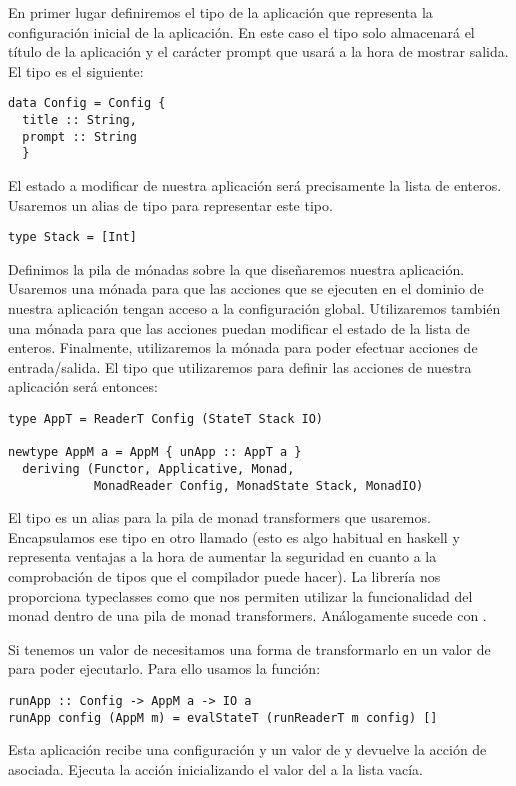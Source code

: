 En primer lugar definiremos el tipo  de la aplicación que
representa la configuración inicial de la aplicación. En este caso
el tipo  solo almacenará el título de la aplicación y
el carácter prompt que usará a la hora de mostrar salida. El tipo
es el siguiente:
\begin{verbatim}
data Config = Config {
  title :: String,
  prompt :: String
  }
\end{verbatim}
El estado a modificar de nuestra aplicación será precisamente la
lista de enteros. Usaremos un alias de tipo para representar este
tipo.
\begin{verbatim}
type Stack = [Int]
\end{verbatim}
Definimos la pila de mónadas sobre la que diseñaremos nuestra
aplicación. Usaremos una mónada
 para que las acciones
que se ejecuten en el dominio de nuestra aplicación
tengan acceso a la configuración global. Utilizaremos también
una mónada  para que las acciones puedan modificar
el estado de la lista de enteros. Finalmente, utilizaremos la
mónada  para poder efectuar acciones de entrada/salida.
El tipo que utilizaremos para definir las acciones de nuestra aplicación
será entonces:
\begin{verbatim}
type AppT = ReaderT Config (StateT Stack IO)

newtype AppM a = AppM { unApp :: AppT a }
  deriving (Functor, Applicative, Monad,
            MonadReader Config, MonadState Stack, MonadIO)
\end{verbatim}
El tipo  es un alias para la pila de monad transformers
que usaremos. Encapsulamos ese tipo en otro llamado  (esto
es algo habitual en haskell y representa ventajas a la
hora de aumentar la seguridad en cuanto a la comprobación de tipos
que el compilador puede hacer). La librería  nos proporciona
typeclasses como  que nos permiten utilizar
la funcionalidad del monad  dentro de una pila
de monad transformers. Análogamente sucede con
.

Si tenemos un valor de  necesitamos una forma de
transformarlo en un valor de  para poder ejecutarlo.
Para ello usamos la función:
\begin{verbatim}
runApp :: Config -> AppM a -> IO a
runApp config (AppM m) = evalStateT (runReaderT m config) []
\end{verbatim}
Esta aplicación recibe una configuración y un valor de
 y devuelve la acción de  asociada. Ejecuta
la acción inicializando el valor del  a la lista vacía.

